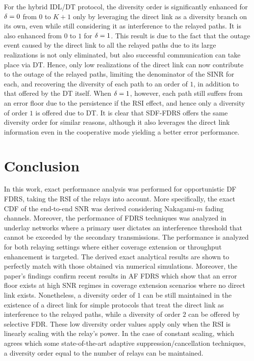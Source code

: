 \documentclass[10pt,journal]{IEEEtran}
\begin{document}
For the hybrid \ac{IDL}/\ac{DT} protocol, the diversity order is significantly enhanced for $\delta=0$ from $0$ to $K+1$ only by leveraging the direct link as a diversity branch on its own, even while still considering it as interference to the relayed paths. It is also enhanced from $0$ to $1$ for $\delta=1$. This result is due to the fact that the outage event caused by the direct link to all the relayed paths due to its large realizations is not only eliminated, but also successful communication can take place via \ac{DT}. Hence, only low realizations of the direct link can now contribute to the outage of the relayed paths, limiting the denominator of the \ac{SINR} for each, and recovering the diversity of each path to an order of $1$, in addition to that offered by the \ac{DT} itself. When $\delta=1$, however, each path still suffers from an error floor due to the persistence if the \ac{RSI} effect, and hence only a diversity of order $1$ is offered due to \ac{DT}. It is clear that \ac{SDF}-\ac{FDRS} offers the same diversity order for similar reasons, although it also leverages the direct link information even in the cooperative mode yielding a better error performance.
\section{Conclusion}
%
In this work, exact performance analysis was performed for opportunistic \ac{DF} \ac{FDRS}, taking the \ac{RSI} of the relays into account. More specifically, the exact \ac{CDF} of the end-to-end \ac{SNR} was derived considering Nakagami-$m$ fading channels. Moreover, the performance of \ac{FDRS} techniques was analyzed in underlay networks where a primary user dictates an interference threshold that cannot be exceeded by the secondary transmissions. The performance is analyzed for both relaying settings where either coverage extension or throughput enhancement is targeted. The derived exact analytical results are shown to perfectly match with those obtained via numerical simulations. Moreover, the paper's findings confirm recent results in \ac{AF} \ac{FDRS} which show that an error floor exists at high \ac{SNR} regimes in coverage extension scenarios where no direct link exists. Nonetheless, a diversity order of $1$ can be still maintained in the existence of a direct link for simple protocols that treat the direct link as interference to the relayed paths, while a diversity of order $2$ can be offered by selective \ac{FDR}. These low diversity order values apply only when the \ac{RSI} is linearly scaling with the relay's power. In the case of constant scaling, which agrees which some state-of-the-art adaptive suppression/cancellation techniques, a diversity order equal to the number of relays can be maintained.
%
\end{document}
